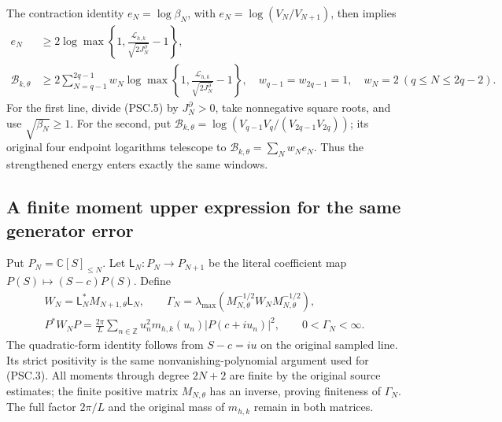 The contraction identity \(e_N=\log\beta_N\), with
\(e_N=\log(V_N/V_{N+1})\), then implies
\[
 \begin{split}
 e_N&\ge
 2\log\max\left\{1,
       \frac{\mathcal L_{h,k}}{\sqrt{2J_N^\partial}}-1\right\},
 \\
 \mathcal B_{k,\theta}
 &\ge2\sum_{N=q-1}^{2q-1}w_N
 \log\max\left\{1,
       \frac{\mathcal L_{h,k}}{\sqrt{2J_N^\partial}}-1\right\},
 \quad
 w_{q-1}=w_{2q-1}=1,\quad w_N=2\ (q\le N\le2q-2).
 \end{split}
 \tag{PSC.6}\label{CFStage:eq:psc-endpoints}
\]
For the first line, divide (PSC.5) by \(J_N^\partial>0\),
take nonnegative square roots, and use \(\sqrt{\beta_N}\ge1\).
For the second, put
\(\mathcal B_{k,\theta}
=\log(V_{q-1}V_q/(V_{2q-1}V_{2q}))\);
its original four endpoint logarithms telescope
to \(\mathcal B_{k,\theta}=\sum_Nw_Ne_N\).
Thus the strengthened energy enters exactly the same windows.

\subsection{A finite moment upper expression for the same generator error}
\label{CFStage:sec:psc-moments}

Put \(P_N=\mathbb C[S]_{\le N}\). Let
\(\mathsf L_N:P_N\to P_{N+1}\) be the literal coefficient map
\(P(S)\mapsto(S-c)P(S)\). Define
\[
 \begin{gathered}
 W_N=\mathsf L_N^*M_{N+1,\theta}\mathsf L_N,\qquad
 \Gamma_N=
 \lambda_{\max}(M_{N,\theta}^{-1/2}W_NM_{N,\theta}^{-1/2}),\\
 P^*W_NP=
 \frac{2\pi}{L}\sum_{n\in\mathbb Z}
 u_n^2m_{h,k}(u_n)|P(c+iu_n)|^2,\qquad
 0<\Gamma_N<\infty .
 \end{gathered}
 \tag{PSC.7}\label{CFStage:eq:psc-moment}
\]
The quadratic-form identity follows from \(S-c=iu\) on the
original sampled line. Its strict positivity is the same
nonvanishing-polynomial argument used for (PSC.3).
All moments through degree \(2N+2\) are finite by the original
source estimates; the finite positive matrix \(M_{N,\theta}\)
has an inverse, proving finiteness of \(\Gamma_N\).
The full factor \(2\pi/L\) and the original mass of \(m_{h,k}\)
remain in both matrices.

